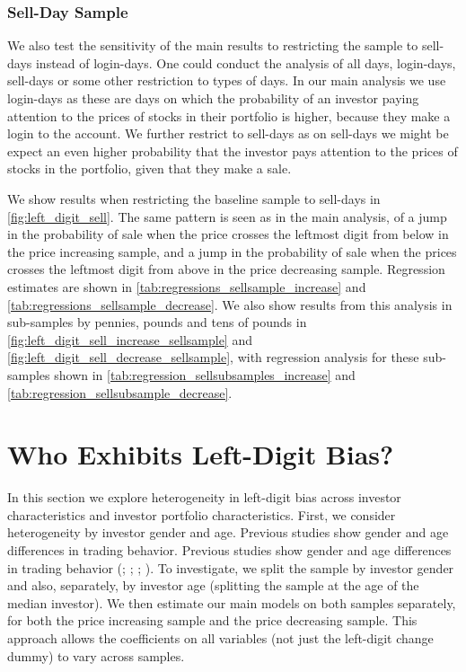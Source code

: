 \subsubsection{Sell-Day Sample}

We also test the sensitivity of the main results to restricting the sample to sell-days instead of login-days. One could conduct the analysis of all days, login-days, sell-days or some other restriction to types of days. In our main analysis we use login-days as these are days on which the probability of an investor paying attention to the prices of stocks in their portfolio is higher, because they make a login to the account. We further restrict to sell-days as on sell-days we might be expect an even higher probability that the investor pays attention to the prices of stocks in the portfolio, given that they make a sale.

We show results when restricting the baseline sample to sell-days in  \ref{fig:left_digit_sell}. The same pattern is seen as in the main analysis, of a jump in the probability of sale when the price crosses the leftmost digit from below in the price increasing sample, and a jump in the probability of sale when the prices crosses the leftmost digit from above in the price decreasing sample. Regression estimates are shown in \ref{tab:regressions_sellsample_increase} and \ref{tab:regressions_sellsample_decrease}. We also show results from this analysis in sub-samples by pennies, pounds and tens of pounds in \ref{fig:left_digit_sell_increase_sellsample} and \ref{fig:left_digit_sell_decrease_sellsample}, with regression analysis for these sub-samples shown in \ref{tab:regression_sellsubsamples_increase} and \ref{tab:regression_sellsubsample_decrease}.

\section{Who Exhibits Left-Digit Bias?}\label{sec:results_heterogeneity}

In this section we explore heterogeneity in left-digit bias across investor characteristics and investor portfolio characteristics. First, we consider heterogeneity by investor gender and age. Previous studies show gender and age differences in trading behavior. Previous studies show gender and age differences in trading behavior (\citealp{barber2001}; \citealp{agnew2003}; \citealp{dorn2005}; \citealp{mitchell2006}). To investigate, we split the sample by investor gender and also, separately, by investor age (splitting the sample at the age of the median investor). We then estimate our main models on both samples separately, for both the price increasing sample and the price decreasing sample. This approach allows the coefficients on all variables (not just the left-digit change dummy) to vary across samples.

